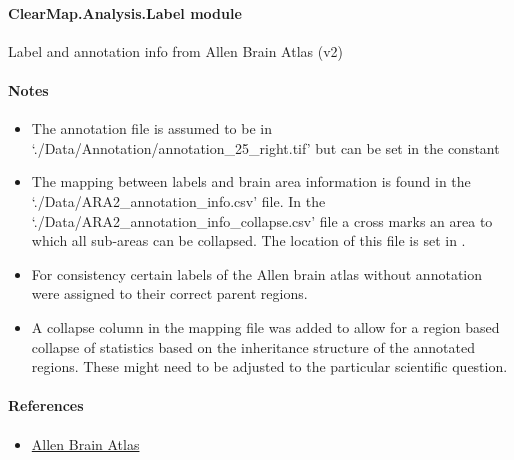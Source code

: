 \documentclass[letterpaper,10pt,english]{sphinxmanual}
\begin{document}
\paragraph{ClearMap.Analysis.Label module}
\label{api/ClearMap.Analysis:module-ClearMap.Analysis.Label}\label{api/ClearMap.Analysis:clearmap-analysis-label-module}
Label and annotation info from Allen Brain Atlas (v2)
\paragraph{Notes}
\begin{itemize}
\item {} 
The annotation file is assumed to be in `./Data/Annotation/annotation\_25\_right.tif'
but can be set in the constant {\hyperref[api/ClearMap.Analysis:ClearMap.Analysis.Label.DefaultLabeledImageFile]{\emph{}}}

\item {} 
The mapping between labels and brain area information is found in the
`./Data/ARA2\_annotation\_info.csv' file.
In the `./Data/ARA2\_annotation\_info\_collapse.csv' file a cross marks an area
to which all sub-areas can be collapsed.
The location of this file is set in {\hyperref[api/ClearMap.Analysis:ClearMap.Analysis.Label.DefaultAnnotationFile]{\emph{}}}.

\item {} 
For consistency certain labels of the Allen brain atlas without
annotation were assigned to their correct parent regions.

\item {} 
A collapse column in the mapping file was added to allow for a region
based collapse of statistics based on the inheritance structure of the
annotated regions. These might need to be adjusted to the particular
scientific question.

\end{itemize}
\paragraph{References}
\begin{itemize}
\item {} 
\href{http://mouse.brain-map.org/static/atlas}{Allen Brain Atlas}

\end{itemize}
\end{document}

